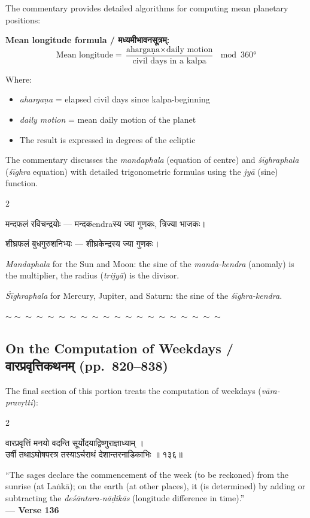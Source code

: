 \documentclass[11pt,a4paper]{article}
\newcommand{\dev}[1]{{\devanagarifont #1}}
\newenvironment{bilingualverse}{%
  \begin{paracol}{2}
  \fontsize{10.5}{13}\selectfont
}{%
  \end{paracol}
  \vspace{0.3cm}
}
\newcommand{\wavydivider}{\begin{center}$\sim\sim\sim\sim\sim\sim\sim\sim\sim\sim\sim\sim\sim\sim\sim\sim\sim\sim\sim\sim$\end{center}}
\begin{document}
The commentary provides detailed algorithms for computing mean planetary positions:

\textbf{Mean longitude formula / \dev{मध्यमीभावनसूत्रम्}:}
\begin{equation*}
\text{Mean longitude} = \frac{\text{ahargaṇa} \times \text{daily motion}}{\text{civil days in a kalpa}} \mod 360°
\end{equation*}

Where:
\begin{itemize}[leftmargin=2em]
  \item \textit{ahargaṇa} = elapsed civil days since kalpa-beginning
  \item \textit{daily motion} = mean daily motion of the planet
  \item The result is expressed in degrees of the ecliptic
\end{itemize}

The commentary discusses the \textit{mandaphala} (equation of centre) and \textit{śīghraphala} (\textit{śīghra} equation) with detailed trigonometric formulas using the \textit{jyā} (sine) function.

\begin{paracol}{2}
\begin{leftcolumn*}
\dev{मन्दफलं रविचन्द्रयोः — मन्दकendraस्य ज्या गुणकः, त्रिज्या भाजकः।}

\dev{शीघ्रफलं बुधगुरुशनिभ्यः — शीघ्रकेन्द्रस्य ज्या गुणकः।}
\end{leftcolumn*}
\begin{rightcolumn}
\textit{Mandaphala} for the Sun and Moon: the sine of the \textit{manda-kendra} (anomaly) is the multiplier, the radius (\textit{trijyā}) is the divisor.

\textit{Śīghraphala} for Mercury, Jupiter, and Saturn: the sine of the \textit{śīghra-kendra}.
\end{rightcolumn}
\end{paracol}

\wavydivider

\subsection*{On the Computation of Weekdays / \dev{वारप्रवृत्तिकथनम्} (pp.\ 820--838)}

The final section of this portion treats the computation of weekdays (\textit{vāra-pravṛtti}):

\begin{bilingualverse}
\begin{leftcolumn*}
\dev{वारप्रवृत्तिं मनयो वदन्ति सूर्योदयाद्विष्णुराज्ञाध्याम् ।}\\
\dev{उर्वी तथाऽघोषपरत्र तस्याऽर्चराथं देशान्तरनाडिकाभिः ॥ १३६॥}
\end{leftcolumn*}
\begin{rightcolumn}
``The sages declare the commencement of the week (to be reckoned) from the sunrise (at Laṅkā); on the earth (at other places), it (is determined) by adding or subtracting the \textit{deśāntara-nāḍikās} (longitude difference in time).''\\[0.3cm]
\hfill\textbf{— Verse 136}
\end{rightcolumn}
\end{bilingualverse}
\end{document}
